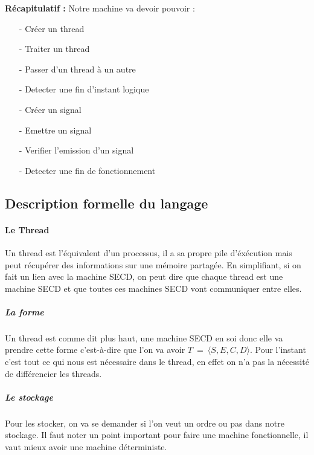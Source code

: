 \documentclass[10pt,a4paper]{report}
\begin{document}
	
	\textbf{Récapitulatif :} Notre machine va devoir pouvoir :
	\begin{multicols}{2}\raggedright{
			\begin{itemize}
				
				\item[-] Créer un thread
				\item[-] Traiter un thread
				\item[-] Passer d'un thread à un autre
				\item[-] Detecter une fin d'instant logique
			\end{itemize}
			
			\begin{itemize}
				
				\item[-] Créer un signal
				\item[-] Emettre un signal
				\item[-] Verifier l'emission d'un signal
				\item[-] Detecter une fin de fonctionnement
			\end{itemize}
		}
	\end{multicols}
	\newpage
	
	
	
	\subsection{Description formelle du langage}
	
	\paragraph{Le Thread}
	Un thread est l'équivalent d'un processus, il a sa propre pile d'éxécution mais peut récupérer des informations sur une mémoire partagée. En simplifiant, si on fait un lien avec la machine SECD, on peut dire que chaque thread est une machine SECD et que toutes ces machines SECD vont communiquer entre elles.
	
	\subparagraph{La forme} 
	Un thread est comme dit plus haut, une machine SECD en soi donc elle va prendre cette forme c'est-à-dire que l'on va avoir $T~=~\langle S,E,C,D\rangle$. Pour l'instant c'est tout ce qui nous est nécessaire dans le thread, en effet on n'a pas la nécessité de différencier les threads.
	\bigbreak
	
	\subparagraph{Le stockage}
	Pour les stocker, on va se demander si l'on veut un ordre ou pas dans notre stockage. Il faut noter un point important pour faire une machine fonctionnelle, il vaut mieux avoir une machine déterministe.
	\medbreak
	
\end{document}
